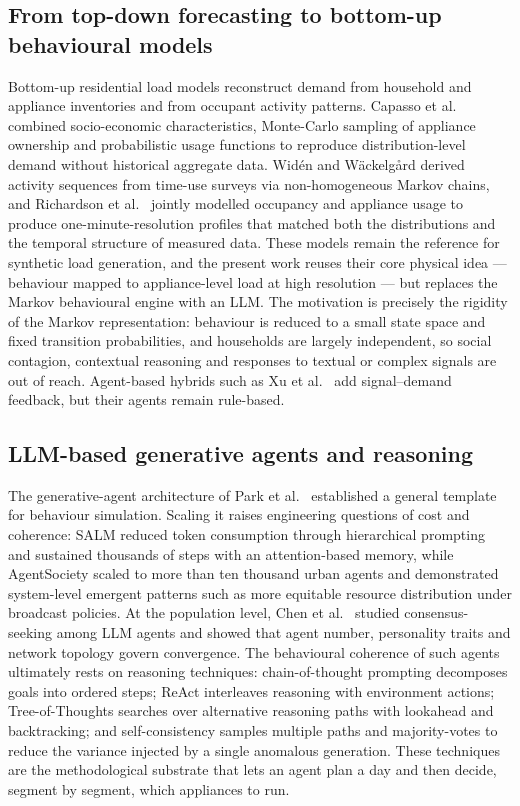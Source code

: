 \documentclass[11pt]{article}
\begin{document}
\subsection{From top-down forecasting to bottom-up behavioural models}
Bottom-up residential load models reconstruct demand from household and appliance inventories and from
occupant activity patterns. Capasso et al.\ \cite{capasso1994} combined socio-economic characteristics,
Monte-Carlo sampling of appliance ownership and probabilistic usage functions to reproduce
distribution-level demand without historical aggregate data. Wid\'en and W\"ackelg\r{a}rd \cite{widen2010}
derived activity sequences from time-use surveys via non-homogeneous Markov chains, and Richardson et al.\
\cite{richardson2010} jointly modelled occupancy and appliance usage to produce one-minute-resolution
profiles that matched both the distributions and the temporal structure of measured data. These models
remain the reference for synthetic load generation, and the present work reuses their core physical idea
--- behaviour mapped to appliance-level load at high resolution --- but replaces the Markov behavioural
engine with an LLM. The motivation is precisely the rigidity of the Markov representation: behaviour is
reduced to a small state space and fixed transition probabilities, and households are largely independent,
so social contagion, contextual reasoning and responses to textual or complex signals are out of reach.
Agent-based hybrids such as Xu et al.\ \cite{xu2026} add signal--demand feedback, but their agents remain
rule-based.

\subsection{LLM-based generative agents and reasoning}
The generative-agent architecture of Park et al.\ \cite{park2023} established a general template for
behaviour simulation. Scaling it raises engineering questions of cost and coherence: SALM
\cite{koley2025} reduced token consumption through hierarchical prompting and sustained thousands of
steps with an attention-based memory, while AgentSociety \cite{piao2025} scaled to more than ten thousand
urban agents and demonstrated system-level emergent patterns such as more equitable resource
distribution under broadcast policies. At the population level, Chen et al.\ \cite{chen2025} studied
consensus-seeking among LLM agents and showed that agent number, personality traits and network topology
govern convergence. The behavioural coherence of such agents ultimately rests on reasoning techniques:
chain-of-thought prompting \cite{wei2022} decomposes goals into ordered steps; ReAct \cite{yao2023a}
interleaves reasoning with environment actions; Tree-of-Thoughts \cite{yao2023b} searches over alternative
reasoning paths with lookahead and backtracking; and self-consistency \cite{wang2023} samples multiple
paths and majority-votes to reduce the variance injected by a single anomalous generation. These
techniques are the methodological substrate that lets an agent plan a day and then decide, segment by
segment, which appliances to run.
\end{document}
